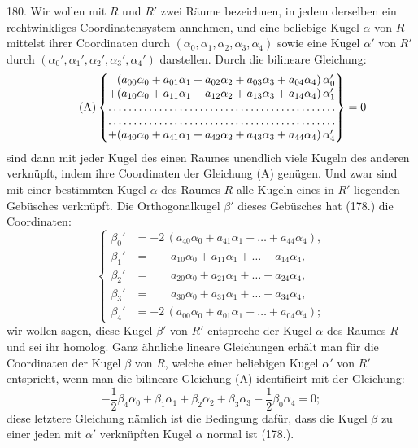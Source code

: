 \begin{center}
\makebox[15em]{\hrulefill}
\end{center}


\label{p20}


\hspace{\parindent}%
180. Wir wollen mit $R$ und $R'$ zwei R\"aume bezeichnen, in
jedem derselben ein rechtwinkliges Coordinatensystem annehmen,
und eine beliebige Kugel $\alpha$ von $R$ mittelst ihrer Coordinaten
durch $(\alpha_0, \alpha_1, \alpha_2,\alpha_3,\alpha_4)$ sowie eine Kugel $\alpha'$ von $R'$ durch
$(\alpha_0', \alpha_1', \alpha_2',\alpha_3',\alpha_4')$ darstellen. Durch die bilineare Gleichung:
\[
\tag*{(A)}
\begin{Bmatrix}
\phantom{+}(a_{00}\alpha_0 + a_{01}\alpha_1 + a_{02}\alpha_2 + a_{03}\alpha_3 + a_{04}\alpha_4)\,\alpha_0' \\
         + (a_{10}\alpha_0 + a_{11}\alpha_1 + a_{12}\alpha_2 + a_{13}\alpha_3 + a_{14}\alpha_4)\,\alpha_1' \\
\hdotsfor{1} \\
\hdotsfor{1} \\
         + (a_{40}\alpha_0 + a_{41}\alpha_1 + a_{42}\alpha_2 + a_{43}\alpha_3 + a_{44}\alpha_4)\,\alpha_4'
\end{Bmatrix} = 0
\]
sind dann mit jeder Kugel des einen Raumes unendlich viele
Kugeln des anderen {\glqq}verkn\"upft{\grqq}, indem ihre Coordinaten der
Gleichung (A) gen\"ugen. Und zwar sind mit einer bestimmten
Kugel $\alpha$ des Raumes $R$ alle Kugeln eines in $R'$ liegenden
Geb\"usches verkn\"upft. Die Orthogonalkugel $\beta'$ dieses Geb\"usches
hat (178.) die Coordinaten:
\[
\tag*{(B)}
\left\{
\begin{aligned}
\beta_0' &=          -2\,( a_{40}\alpha_0 + a_{41}\alpha_1 + \hdots + a_{44}\alpha_4), \\
\beta_1' &= \phantom{-2\,(}a_{10}\alpha_0 + a_{11}\alpha_1 + \hdots + a_{14}\alpha_4, \\
\beta_2' &= \phantom{-2\,(}a_{20}\alpha_0 + a_{21}\alpha_1 + \hdots + a_{24}\alpha_4, \\
\beta_3' &= \phantom{-2\,(}a_{30}\alpha_0 + a_{31}\alpha_1 + \hdots + a_{34}\alpha_4, \\
\beta_4' &=          -2\,( a_{00}\alpha_0 + a_{01}\alpha_1 + \hdots + a_{04}\alpha_4);
\end{aligned}
\right.
\]
wir wollen sagen, diese Kugel $\beta'$ von $R'$ {\glqq}entspreche{\grqq} der
Kugel $\alpha$ des Raumes $R$ und sei ihr {\glqq}homolog{\grqq}. Ganz \"ahnliche
lineare Gleichungen erh\"alt man f\"ur die Coordinaten
der Kugel $\beta$ von $R$, welche einer beliebigen Kugel $\alpha'$ von $R'$
entspricht, wenn man die bilineare Gleichung (A) identificirt
mit der Gleichung:
\[
\tag{C}
-\textstyle\frac{1}{2}\beta_4\alpha_0 + \beta_1\alpha_1 +
\beta_2\alpha_2 + \beta_3\alpha_3 -\textstyle\frac{1}{2}\beta_0\alpha_4
=0;
\]
diese letztere Gleichung n\"amlich ist die Bedingung daf\"ur,
dass die Kugel $\beta$ zu einer jeden mit $\alpha'$ verkn\"upften Kugel $\alpha$
normal ist (178.).

